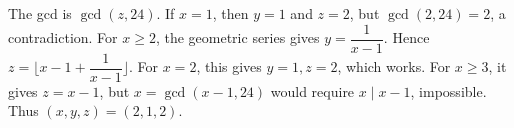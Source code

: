 The gcd is $\gcd(z,24)$. If $x=1$, then $y=1$ and $z=2$, but $\gcd(2,24)=2$, a contradiction. For $x\ge2$, the geometric series gives $y=\dfrac{1}{x-1}$. Hence $z=\lfloor x-1+\dfrac{1}{x-1}\rfloor$. For $x=2$, this gives $y=1,z=2$, which works. For $x\ge3$, it gives $z=x-1$, but $x=\gcd(x-1,24)$ would require $x\mid x-1$, impossible. Thus $\boxed{(x,y,z)=(2,1,2)}$.
